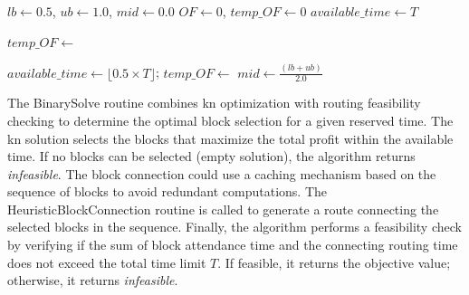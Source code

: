 \begin{algorithm}[h!]
	\caption{SolveScenario}
	\SetAlgoLined

	$lb \leftarrow 0.5$, $ub \leftarrow 1.0$, $mid \leftarrow 0.0$\;
	$OF \leftarrow 0$, $temp\_OF \leftarrow 0$\;
	$available\_time \leftarrow T$\;

	$temp\_OF \leftarrow$ \;

	$available\_time \leftarrow \lfloor 0.5 \times T \rfloor$; 
	$temp\_OF \leftarrow$ \;
	$mid \leftarrow \frac{(lb + ub)}{2.0}$\;


	\;
\end{algorithm}

The BinarySolve routine combines \gls{kn} optimization with routing feasibility checking to determine the optimal block selection for a given reserved time. The \gls{kn} solution selects the blocks that maximize the total profit within the available time. If no blocks can be selected (empty solution), the algorithm returns \textit{infeasible}. The block connection could use a caching mechanism based on the sequence of blocks to avoid redundant computations. The HeuristicBlockConnection routine is called to generate a route connecting the selected blocks in the sequence. Finally, the algorithm performs a feasibility check by verifying if the sum of block attendance time and the connecting routing time does not exceed the total time limit $T$. If feasible, it returns the objective value; otherwise, it returns \textit{infeasible}.

